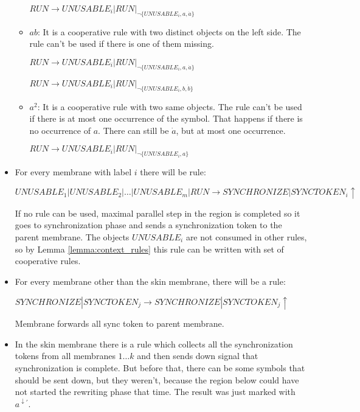 \begin{dokaz}
\begin{itemize}
\begin{itemize}
      $RUN \rightarrow UNUSABLE_i|RUN|_{\neg\{UNUSABLE_i, a, \dot{a}\}}$

      \item $ab$: It is a cooperative rule with two distinct objects on the left side. The rule can't be used if there is one of them missing.

      $RUN \rightarrow UNUSABLE_i|RUN|_{\neg\{UNUSABLE_i, a, \dot{a}\}}$

      $RUN \rightarrow UNUSABLE_i|RUN|_{\neg\{UNUSABLE_i, b, \dot{b}\}}$

      \item $a^2$: It is a cooperative rule with two same objects. The rule can't be used if there is at most one occurrence of the symbol. That happens if there is no occurrence of $a$. There can still be $\dot{a}$, but at most one occurrence.

      $RUN \rightarrow UNUSABLE_i|RUN|_{\neg\{UNUSABLE_i, a\}}$
    \end{itemize}

    

    \item For every membrane with label $i$ there will be rule:

    $UNUSABLE_1|UNUSABLE_2|\dots|UNUSABLE_m|RUN \rightarrow SYNCHRONIZE|SYNCTOKEN_i\uparrow$

    If no rule can be used, maximal parallel step in the region is completed so it goes to synchronization phase and sends a synchronization token to the parent membrane. The objects $UNUSABLE_i$ are not consumed in other rules, so by Lemma \ref{lemma:context_rules} this rule can be written with set of cooperative rules.

    \item For every membrane other than the skin membrane, there will be a rule:

    $SYNCHRONIZE|SYNCTOKEN_j \rightarrow SYNCHRONIZE|SYNCTOKEN_j\uparrow$

    Membrane forwards all sync token to parent membrane.

    \item In the skin membrane there is a rule which collects all the synchronization tokens from all membranes $1\dots k$ and then sends down signal that synchronization is complete. But before that, there can be some symbols that should be sent down, but they weren't, because the region below could have not started the rewriting phase that time. The result was just marked with $a^{\downarrow\prime}$.


\end{itemize}
\end{dokaz}
